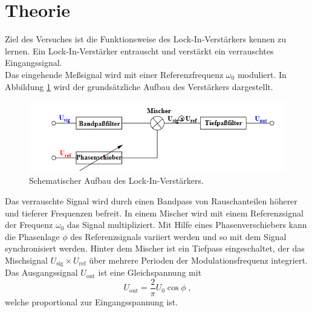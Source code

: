 \section{Theorie}
\label{sec:Theorie}
Ziel des Versuches ist die Funktionsweise des Lock-In-Verstärkers kennen zu lernen.
Ein Lock-In-Verstärker entrauscht und verstärkt ein verrauschtes Eingangssignal.\\
Das eingehende Meßsignal wird mit einer Referenzfrequenz $\omega_0$ moduliert.
In Abbildung \ref{fig:aug} wird der grundsätzliche Aufbau des Verstärkers dargestellt.
\begin{figure}
    \centering
    \caption{Schematischer Aufbau des Lock-In-Verstärkers.\cite{v303}}
    \label{fig:aug}
    \includegraphics[width = 0.6 \textwidth]{Pics/gauf.png}
\end{figure}
Das verrauschte Signal wird durch einen Bandpass von Rauschanteilen höherer und tieferer Frequenzen befreit. In einem Mischer
wird mit einem Referenzsignal der Frequenz $\omega_0$ das Signal multipliziert. Mit Hilfe eines Phasenverschiebers kann die Phasenlage $\phi$
des Referenzsignals variiert werden und so mit dem Signal synchronisiert werden. Hinter dem Mischer ist ein Tiefpass eingeschaltet, der das Mischsignal $U_\text{sig} \times
U_\text{ref}$ über mehrere Perioden der Modulationsfrequenz integriert. Das Ausgangssignal $U_\text{out}$ ist eine Gleichspannung mit
\begin{equation}
    U_\text{out} =  \frac{2}{\pi}U_0 \cos \phi \; \text{,} \label{eqn:cosine}
\end{equation}
welche proportional zur Eingangsspannung ist.